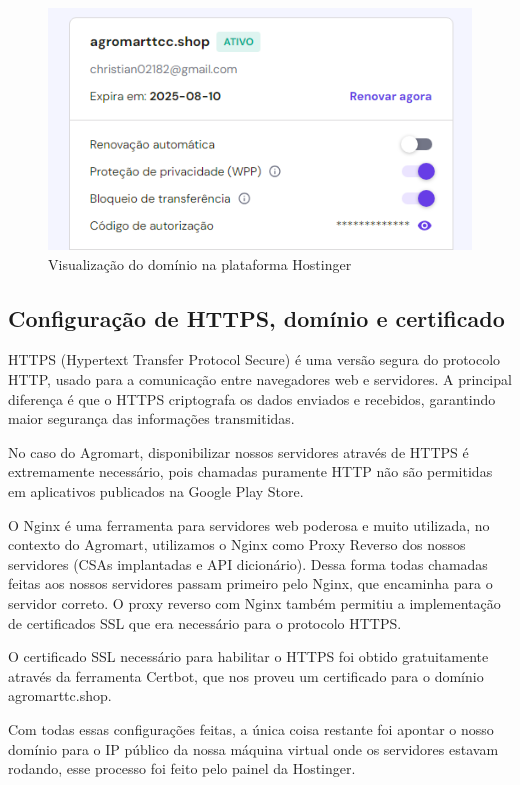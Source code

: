 \begin{figure}[h]
	\centering
	\includegraphics[keepaspectratio=true,scale=0.35]{figuras/dominio.png}
	\caption{Visualização do domínio na plataforma Hostinger}
	\label{dominio}
\end{figure}

\subsection{Configuração de HTTPS, domínio e certificado}
HTTPS (Hypertext Transfer Protocol Secure) é uma versão segura do protocolo HTTP, usado para a comunicação entre navegadores web e servidores. A principal diferença é que o HTTPS criptografa os dados enviados e recebidos, garantindo maior segurança das informações transmitidas.

No caso do Agromart, disponibilizar nossos servidores através de HTTPS é extremamente necessário, pois chamadas puramente HTTP não são permitidas em aplicativos publicados na Google Play Store.

O Nginx é uma ferramenta para servidores web poderosa e muito utilizada, no contexto do Agromart, utilizamos o Nginx como Proxy Reverso dos nossos servidores (CSAs implantadas e API dicionário). Dessa forma todas chamadas feitas aos nossos servidores passam primeiro pelo Nginx, que encaminha para o servidor correto. O proxy reverso com Nginx também permitiu a implementação de certificados SSL que era necessário para o protocolo HTTPS.

 O certificado SSL necessário para habilitar o HTTPS foi obtido gratuitamente através da ferramenta Certbot, que nos proveu um certificado para o domínio agromarttc.shop.

 Com todas essas configurações feitas, a única coisa restante foi apontar o nosso domínio para o IP público da nossa máquina virtual onde os servidores estavam rodando, esse processo foi feito pelo painel da Hostinger.

